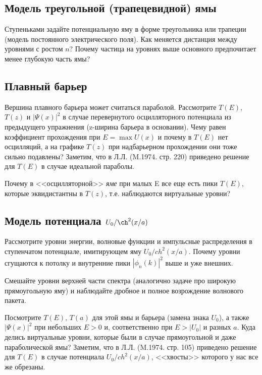 \documentclass[12pt]{article}
\begin{document}
\hypertarget{triangular_well}{}\subsection{Модель треугольной
(трапецевидной) ямы}
Ступеньками задайте потенциальную яму в форме
треугольника или трапеции (модель постоянного электрического
поля). Как меняется дистанция между уровнями
с ростом $n$? Почему частица на уровнях выше основного
предпочитает менее глубокую  часть ямы?

\hypertarget{Parapolic barrier}{}\subsection{Плавный барьер}
Вершина плавного барьера может считаться параболой.
Рассмотрите $T(E)$, $T(z)$ и $|\Psi (x)|^2$ в случае
перевернутого осцилляторного потенциала из предыдущего упражнения
(z-ширина барьера в основании). Чему равен коэффициент
прохождения при $E=\max U(x)$ и почему в $T(E)$ нет осцилляций, а
на графике $T(z)$ при надбарьерном прохождении они тоже сильно
подавлены? Заметим, что в Л.Л. (M.1974. стр. 220) приведено
решение для $T(E)$ в случае идеальной параболы.

Почему в <<осцилляторной>> {\em яме}
при малых E все еще есть пики $T(E)$, которые эквидистантны в
$T(z)$, т.е. наблюдаются виртуальные уровни?

\hypertarget{Landau well/barrier}{}\subsection[Модель
безотражательного потенциала]{Модель потенциала $U_0/\ch^2(x/a)$}
Рассмотрите уровни энергии, волновые функции и импульсные
распределения в ступенчатом потенциале, имитирующем яму
$U_0/ch^2(x/a)$. Почему уровни сгущаются к потолку и внутренние
пики $|\phi_n(k)|^2$ выше и уже внешних.

Смешайте уровни верхней части спектра (аналогично задаче про
широкую прямоугольную яму) и наблюдайте дробное и полное
возрождение волнового пакета.

Посмотрите $T(E)$, $T(a)$ для этой
ямы и барьера (замена знака $U_0$), а также $|\Psi (x)|^2$ при
небольших $E>0$ и, соответственно при $E>|U_0|$ и разных $a$.
Куда делись виртуальные уровни, которые были в случае
прямоугольной и даже параболической ямы? Заметим, что в Л.Л.
(M.1974. стр. 105) приведено решение для $T(E)$ в случае
потенциала $U_0/ch^2(x/a)$, <<хвосты>> которого у нас все же
обрезаны.
\end{document}
